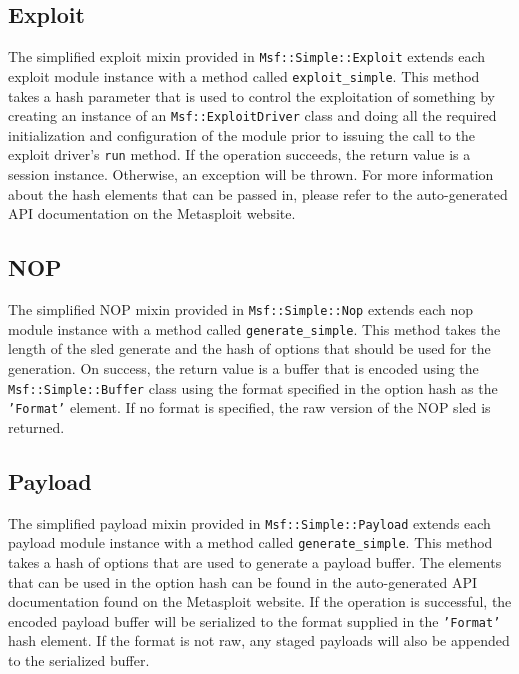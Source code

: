 \documentclass{report}
\begin{document}
        \subsection{Exploit}

\par
The simplified exploit mixin provided in
\texttt{Msf::Simple::Exploit} extends each exploit module instance
with a method called \texttt{exploit\_simple}.  This method takes a
hash parameter that is used to control the exploitation of something
by creating an instance of an \texttt{Msf::ExploitDriver} class and
doing all the required initialization and configuration of the
module prior to issuing the call to the exploit driver's
\texttt{run} method.  If the operation succeeds, the return value is
a session instance.  Otherwise, an exception will be thrown.  For
more information about the hash elements that can be passed in,
please refer to the auto-generated API documentation on the
Metasploit website.

        \subsection{NOP}

\par
The simplified NOP mixin provided in \texttt{Msf::Simple::Nop}
extends each nop module instance with a method called
\texttt{generate\_simple}.  This method takes the length of the sled
generate and the hash of options that should be used for the
generation.  On success, the return value is a buffer that is
encoded using the \texttt{Msf::Simple::Buffer} class using the
format specified in the option hash as the \texttt{'Format'}
element.  If no format is specified, the raw version of the NOP sled
is returned.

        \subsection{Payload}

\par
The simplified payload mixin provided in
\texttt{Msf::Simple::Payload} extends each payload module instance
with a method called \texttt{generate\_simple}.  This method takes a
hash of options that are used to generate a payload buffer.  The
elements that can be used in the option hash can be found in the
auto-generated API documentation found on the Metasploit website. If
the operation is successful, the encoded payload buffer will be
serialized to the format supplied in the \texttt{'Format'} hash
element.  If the format is not raw, any staged payloads will also be
appended to the serialized buffer.
\end{document}
